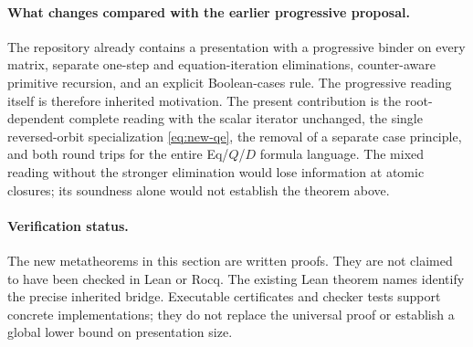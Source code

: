 \paragraph{What changes compared with the earlier progressive proposal.}
The repository already contains a presentation with a progressive binder
on every matrix, separate one-step and equation-iteration eliminations,
counter-aware primitive recursion, and an explicit Boolean-cases rule.\cite{progressive}
The progressive reading itself is therefore inherited motivation.  The
present contribution is the root-dependent complete reading with the scalar
iterator unchanged, the single reversed-orbit specialization
\eqref{eq:new-qe}, the removal of a separate case principle, and both
round trips for the entire Eq/$Q$/$D$ formula language.  The mixed reading
without the stronger elimination would lose information at atomic closures;
its soundness alone would not establish the theorem above.

\paragraph{Verification status.}
The new metatheorems in this section are written proofs.  They are not claimed
to have been checked in Lean or Rocq.  The existing Lean theorem names identify
the precise inherited bridge.  Executable certificates and checker tests
support concrete implementations; they do not replace the universal proof
or establish a global lower bound on presentation size.
